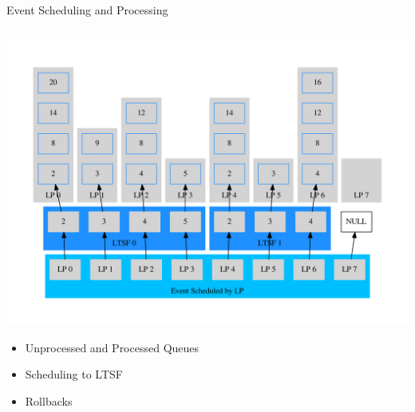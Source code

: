 \documentclass[10pt]{beamer}
\begin{document}
\begin{frame}{Event Scheduling and Processing}
\begin{columns}
        \begin{column}{0.6\textwidth}
            \centerline{\includegraphics[width=1.35\textwidth]{../figs/graphviz/pending_event_set.pdf}}
            \vspace{-\bigskipamount}
            \vspace{-\bigskipamount}
            \begin{itemize}
                \item Unprocessed and Processed Queues
                \item Scheduling to LTSF
                \item Rollbacks
            \end{itemize}
        \end{column}

    \end{columns}
\end{frame}
\end{document}

